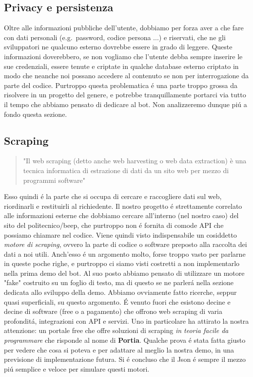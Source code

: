 \documentclass[]{article}
\begin{document}
\subsection{Privacy e persistenza}
Oltre alle informazioni pubbliche dell'utente, dobbiamo per forza aver a che fare con dati personali (e.g.\ password, codice persona ...) e riservati, che ne gli sviluppatori ne qualcuno esterno dovrebbe essere in grado di leggere. Queste informazioni doverebbero, se non vogliamo che l'utente debba sempre inserire le sue credenziali, essere tenute e criptate in qualche database esterno criptato in modo che neanche noi possano accedere al contenuto se non per interrogazione da parte del codice. Purtroppo questa problematica é una parte troppo grossa da risolvere in un progetto del genere, e potrebbe tranquillamente portarci via tutto il tempo che abbiamo pensato di dedicare al bot. Non analizzeremo dunque piú a fondo questa sezione. 

\subsection{Scraping}
\begin{quote} 
"Il web scraping (detto anche web harvesting o web data extraction) è una tecnica informatica di estrazione di dati da un sito web per mezzo di programmi software"
\end{quote}
Esso quindi é la parte che si occupa di cercare e raccogliere dati sul web, riordinarli e restituirli al richiedente. Il nostro progetto é strettamente correlato alle informazioni esterne che dobbiamo cercare all'interno (nel nostro caso) del sito del politecnico/beep, che purtroppo non é fornita di comode API che possiamo chiamare nel codice. Viene quindi visto indispensabile un cosiddetto \textit{motore di scraping}, ovvero la parte di codice o software preposto alla raccolta dei dati a noi utili. Anch'esso é un argomento molto, forse troppo vasto per parlarne in queste poche righe, e purtroppo ci siamo visti costretti a non implementarlo nella prima demo del bot. Al suo posto abbiamo pensato di utilizzare un motore "fake" costruito su un foglio di testo, ma di questo se ne parlerá nella sezione dedicata allo sviluppo della demo. Abbiamo ovviamente fatto ricerche, seppur quasi superficiali, su questo argomento. É venuto fuori che esistono decine e decine di software (free o a pagamento) che offrono web scraping di varia profonditá, integrazioni con API e servizi. Uno in particolare ha attirato la nostra attenzione: un portale free che offre soluzioni di scraping \textit{in teoria facile da programmare} che risponde al nome di \textbf{Portia}. Qualche prova é stata fatta giusto per vedere che cosa si poteva e per adattare al meglio la nostra demo, in una previsione di implementazione futura. Si é concluso che il Json é sempre il mezzo piú semplice e veloce per simulare questi motori.
\end{document}
